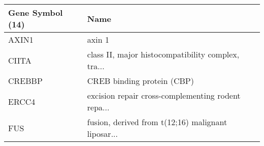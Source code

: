 \begin{tabular}{ll}
\toprule
Gene Symbol (14) &                                               Name \\
\midrule
           AXIN1 &                                             axin 1 \\
           CIITA & class II, major histocompatibility complex, tra... \\
          CREBBP &                         CREB binding protein (CBP) \\
           ERCC4 & excision repair cross-complementing rodent repa... \\
             FUS & fusion, derived from t(12;16) malignant liposar... \\
\bottomrule
\end{tabular}
